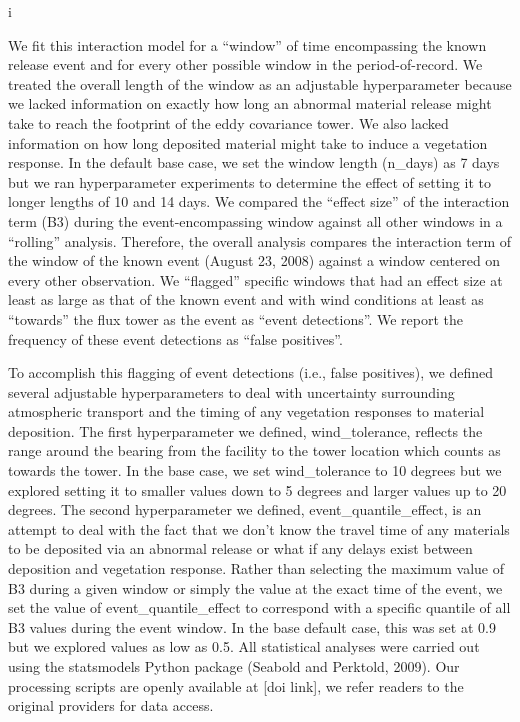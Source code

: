 i\documentclass{article}
\begin{document}

We fit this interaction model for a “window” of time encompassing the known release event and for every other possible window in the period-of-record. We treated the overall length of the window as an adjustable hyperparameter because we lacked information on exactly how long an abnormal material release might take to reach the footprint of the eddy covariance tower. We also lacked information on how long deposited material might take to induce a vegetation response. In the default base case, we set the window length (n\_days) as 7 days but we ran hyperparameter experiments to determine the effect of setting it to longer lengths of 10 and 14 days. We compared the “effect size” of the interaction term (B3) during the event-encompassing window against all other windows in a “rolling” analysis. Therefore, the overall analysis compares the interaction term of the window of the known event (August 23, 2008) against a window centered on every other observation. We “flagged” specific windows that had an effect size at least as large as that of the known event and with wind conditions at least as “towards” the flux tower as the event as “event detections”. We report the frequency of these event detections as “false positives”.

To accomplish this flagging of event detections (i.e., false positives), we defined several adjustable hyperparameters to deal with uncertainty surrounding atmospheric transport and the timing of any vegetation responses to material deposition. The first hyperparameter we defined, wind\_tolerance, reflects the range around the bearing from the facility to the tower location which counts as towards the tower. In the base case, we set wind\_tolerance to 10 degrees but we explored setting it to smaller values down to 5 degrees and larger values up to 20 degrees. The second hyperparameter we defined, event\_quantile\_effect, is an attempt to deal with the fact that we don't know the travel time of any materials to be deposited via an abnormal release or what if any delays exist between deposition and vegetation response. Rather than selecting the maximum value of B3 during a given window or simply the value at the exact time of the event, we set the value of event\_quantile\_effect to correspond with a specific quantile of all B3 values during the event window. In the base default case, this was set at 0.9 but we explored values as low as 0.5. All statistical analyses were carried out using the statsmodels Python package (Seabold and Perktold, 2009). Our processing scripts are openly available at [doi link], we refer readers to the original providers for data access.
\end{document}
